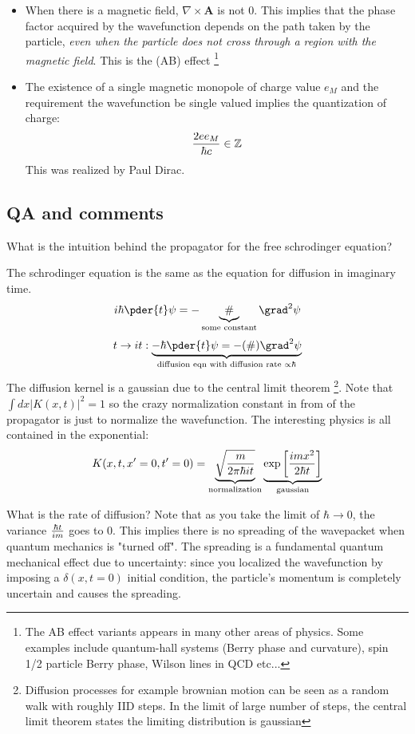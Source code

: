 \documentclass[10pt]{scrartcl}
\begin{document}
\begin{itemize}
	\item  When there is a magnetic field, $\nabla \times \mathbf{A}$ is not 0.  This implies that the phase factor acquired by the wavefunction depends on the path taken by the particle, \emph{even when the particle does not cross through a region with the magnetic field}.  This is the  (AB) effect \footnote{The AB effect variants appears in many other areas of physics.  Some examples include quantum-hall systems (Berry phase and curvature), spin 1/2 particle Berry phase, Wilson lines in QCD etc...}
	\item The existence of a single magnetic monopole of charge value $e_M$ and the requirement the wavefunction be single valued implies the quantization of charge:
	\[{2 e e_M \over  \hbar c} \in \mathbb{Z} \]
	This was realized by Paul Dirac.
	
	\end{itemize}

\subsection{QA and comments}

\begin{myquestion}
	What is the intuition behind the propagator for the free schrodinger equation?
	\end{myquestion}

The schrodinger equation is the same as the equation for diffusion in imaginary time. 
\[i \hbar \pder{t} \psi =  -\underbrace{\#}_{\text{some constant}} \grad^2 \psi \]
\[t \rightarrow i t \space :  \underbrace{- \hbar \pder{t} \psi= - \space ( \# ) \space \grad^2 \psi}_{\text{diffusion eqn with diffusion rate } \propto \hbar}\] The diffusion kernel is a gaussian due to the central limit theorem \footnote{Diffusion processes for example brownian motion can be seen as a random walk with roughly IID steps. In the limit of large number of steps, the central limit theorem states the limiting distribution is gaussian}.  Note that $\int dx |K(x, t)|^2 = 1$ so the crazy normalization constant in from of the propagator is just to normalize the wavefunction.  The interesting physics is all contained in the exponential:
\[ K(x, t, x'=0, t'=0) = \underbrace{\sqrt{m \over 2 \pi \hbar i t}}_{\text{normalization}}  \underbrace{\exp \left[ {i m x^2 \over 2 \hbar t} \right]}_{\text{gaussian}} \]

What is the rate of diffusion? Note that as you take the limit of $\hbar \rightarrow 0$, the variance ${\hbar t \over im}$ goes to 0.  This implies there is no spreading of the wavepacket when quantum mechanics is "turned off".  The spreading is a fundamental quantum mechanical effect due to uncertainty: since you localized the wavefunction by imposing a $\delta(x, t=0)$ initial condition, the particle's momentum is completely uncertain and causes the spreading.
\end{document}
